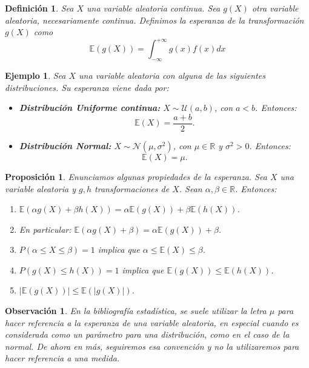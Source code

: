 \documentclass{report}
\newtheorem{prop}{Proposición}[section]
\newtheorem{dfn}{Definición}[section]
\newtheorem{obs}{Observación}[section]
\newtheorem{ej}{Ejemplo}[section]
\begin{document}
\begin{dfn}
Sea $X$ una variable aleatoria continua. Sea $g(X)$ otra variable aleatoria, necesariamente continua. 
Definimos la esperanza de la transformación $g(X)$ como
\begin{equation*}
\mathbb{E}(g(X)) = \int_{-\infty}^{+\infty} g(x)f(x)dx
\end{equation*}
\end{dfn}

\begin{ej}
Sea \( X \) una variable aleatoria con alguna de las siguientes distribuciones. Su esperanza viene dada por:

\begin{itemize}
    \item \textbf{Distribución Uniforme continua:} \( X \sim \mathcal{U}(a, b) \), con \( a < b \). Entonces:
    \[
    \mathbb{E}(X) = \frac{a + b}{2}.
    \]

    \item \textbf{Distribución Normal:} \( X \sim \mathcal{N}(\mu, \sigma^2) \), con \( \mu \in \mathbb{R} \) y \( \sigma^2 > 0 \). Entonces:
    \[
    \mathbb{E}(X) = \mu.
    \]
\end{itemize}
\end{ej}

\begin{prop}
    Enunciamos algunas propiedades de la esperanza. Sea $X$ una variable aleatoria y $g,h$ transformaciones
    de $X$. Sean $\alpha,\beta\in\mathbb{R}$. Entonces:
    \begin{enumerate}
        \item $\mathbb{E}(\alpha g(X) + \beta h(X)) = \alpha \mathbb{E}(g(X))+ \beta \mathbb{E}(h(X))$.
        \item En particular: $\mathbb{E}(\alpha g(X) + \beta) = \alpha\mathbb{E}( g(X) ) + \beta$.
        \item $P(\alpha\leq X \leq \beta) = 1$ implica que $\alpha\leq \mathbb{E}(X) \leq \beta$.
        \item $P(g(X)\leq h(X)) = 1$ implica que $\mathbb{E}(g(X)) \leq \mathbb{E}(h(X))$.
        \item $|\mathbb{E}(g(X))|\leq \mathbb{E}(|g(X)|)$.
    \end{enumerate}
\end{prop}


\begin{obs}
    En la bibliografía estadística, se suele utilizar la letra $\mu$ para hacer referencia a la esperanza
    de una variable aleatoria, en especial cuando es considerada como un parámetro para una distribución,
    como en el caso de la normal. De ahora en más, seguiremos esa convención y no la utilizaremos para
    hacer referencia a una medida.
\end{obs}
\end{document}
